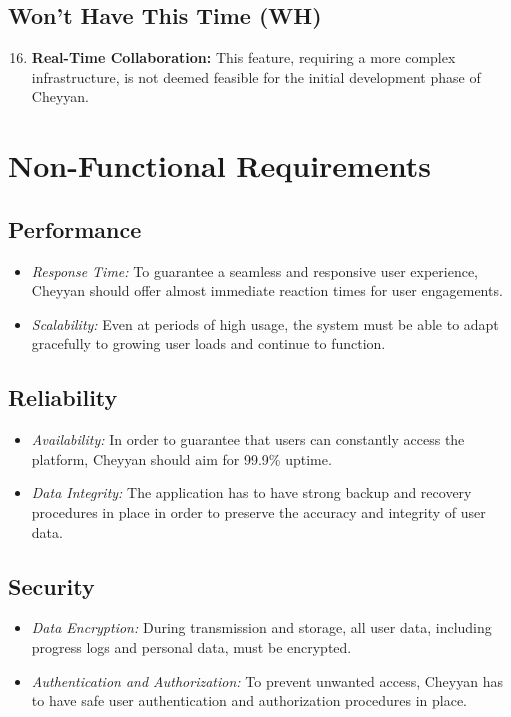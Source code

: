 \documentclass{l4proj}
\begin{document}
\subsection{Won't Have This Time (WH)}

\begin{enumerate}
    \setcounter{enumi}{15}
    \item \textbf{Real-Time Collaboration:} This feature, requiring a more complex infrastructure, is not deemed feasible for the initial development phase of Cheyyan.
\end{enumerate}

\section{Non-Functional Requirements}
\subsection{Performance}
\begin{itemize}
    \item \textit{Response Time:} To guarantee a seamless and responsive user experience, Cheyyan should offer almost immediate reaction times for user engagements.
    \item \textit{Scalability:} Even at periods of high usage, the system must be able to adapt gracefully to growing user loads and continue to function.
\end{itemize}

\subsection{ Reliability}
\begin{itemize}
    \item \textit{Availability:} In order to guarantee that users can constantly access the platform, Cheyyan should aim for 99.9\% uptime.
    \item \textit{Data Integrity:} The application has to have strong backup and recovery procedures in place in order to preserve the accuracy and integrity of user data.
\end{itemize}

\subsection{Security}
\begin{itemize}
    \item \textit{Data Encryption:} During transmission and storage, all user data, including progress logs and personal data, must be encrypted.
    \item \textit{Authentication and Authorization:} To prevent unwanted access, Cheyyan has to have safe user authentication and authorization procedures in place.
\end{itemize}
\end{document}
